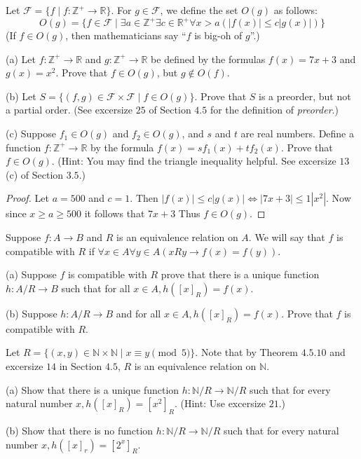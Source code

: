 \begin{tcolorbox}[title=Problem 19, breakable]
    Let $\mathcal{F} = \{f \mid f : \mathbb{Z}^+ \rightarrow \mathbb{R}\}$.
    For $g \in \mathcal{F}$, we define the set $O(g)$ as follows:
    \[O(g) = \{f \in \mathcal{F} \mid \exists{a} \in \mathbb{Z}^+
                \exists{c} \in \mathbb{R}^+ \forall{x} > a (|f(x)| \le c|g(x)|)\}\]
    (If $f \in O(g)$, then mathematicians say ``$f$ is big-oh of $g$''.)

    (a) Let $f : \mathbb{Z}^+ \rightarrow \mathbb{R}$ and $g : \mathbb{Z}^+ \rightarrow \mathbb{R}$
        be defined by the formulas $f(x) = 7x + 3$ and $g(x) = x^2$. 
        Prove that $f \in O(g)$, but $g \notin O(f)$.

    (b) Let $S = \{(f, g) \in \mathcal{F} \times \mathcal{F} \mid f \in O(g)\}$. Prove that 
        $S$ is a preorder, but not a partial order. (See excersize $25$  of Section $4.5$
        for the definition of \emph{preorder}.)

    (c) Suppose $f_1 \in O(g)$ and $f_2 \in O(g)$, and $s$ and $t$ are real numbers.
        Define a function $f : \mathbb{Z}^+ \rightarrow \mathbb{R}$ by the formula 
        $f(x) = sf_1(x) + tf_2(x)$. Prove that $f \in O(g)$.
        (Hint: You may find the triangle inequality helpful. See excersize $13$(c)
         of Section $3.5$.)
\end{tcolorbox}

\begin{proof}
    Let $a = 500$ and $c = 1$.
    Then $|f(x)| \le c|g(x)| \iff |7x + 3| \le 1|x^2|$.
    Now since $x \ge a \ge 500$ 
        it follows that $7x + 3 $
    Thus $f \in O(g)$.
\end{proof}

\begin{tcolorbox}[title=Problem 21, breakable]
    Suppose $f : A \rightarrow B$ and $R$ is an equivalence relation on $A$.
    We will say that $f$ is compatible with $R$ if 
    $\forall{x} \in A \forall{y} \in A (xRy \rightarrow f(x) = f(y))$.

    (a) Suppose $f$ is compatible with $R$ prove that there is a unique function 
        $h : A / R \rightarrow B$ such that for all $x \in A, h([x]_R) = f(x)$.

    (b) Suppose $h : A / R \rightarrow B$ and for all $x \in A, h([x]_R) = f(x)$.
        Prove that $f$ is compatible with $R$.
\end{tcolorbox}

\begin{tcolorbox}[title=Problem 22, breakable]
    Let $R = \{(x, y) \in \mathbb{N} \times \mathbb{N} \mid x \equiv y \pmod{5}\}$.
    Note that by Theorem $4.5.10$ and excersize $14$ in Section $4.5$, $R$ is an 
    equivalence relation on $\mathbb{N}$.

    (a) Show that there is a unique function $h : \mathbb{N} / R \rightarrow \mathbb{N} / R$
        such that for every natural number $x, h([x]_R) = [x^2]_R$. (Hint: Use excersize $21$.)

    (b) Show that there is no function $h : \mathbb{N} / R \rightarrow \mathbb{N} / R$
        such that for every natural number $x, h([x]_r) = [2^x]_R$.
\end{tcolorbox}

